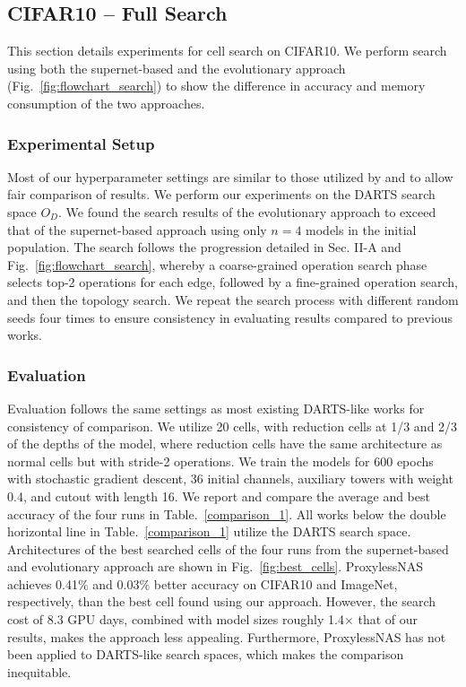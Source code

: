 \documentclass[onecolumn]{IEEEtran}
\begin{document}
\subsection{CIFAR10 – Full Search}
This section details experiments for cell search on CIFAR10. We perform search using both the supernet-based and the evolutionary approach (Fig.~\ref{fig:flowchart_search}) to show the difference in accuracy and memory consumption of the two approaches.

\subsubsection{Experimental Setup}
Most of our hyperparameter settings are similar to those utilized by \cite{Liu2018} and \cite{Wang2021} to allow fair comparison of results. We perform our experiments on the DARTS search space \( O_D \). We found the search results of the evolutionary approach to exceed that of the supernet-based approach using only \( n = 4 \) models in the initial population. The search follows the progression detailed in Sec. II-A and Fig.~\ref{fig:flowchart_search}, whereby a coarse-grained operation search phase selects top-2 operations for each edge, followed by a fine-grained operation search, and then the topology search. We repeat the search process with different random seeds four times to ensure consistency in evaluating results compared to previous works.

\subsubsection{Evaluation}
Evaluation follows the same settings as most existing DARTS-like works for consistency of comparison. We utilize 20 cells, with reduction cells at 1/3 and 2/3 of the depths of the model, where reduction cells have the same architecture as normal cells but with stride-2 operations. We train the models for 600 epochs with stochastic gradient descent, 36 initial channels, auxiliary towers with weight 0.4, and cutout with length 16. We report and compare the average and best accuracy of the four runs in Table.~\ref{comparison_1}. All works below the double horizontal line in Table.~\ref{comparison_1} utilize the DARTS search space. Architectures of the best searched cells of the four runs from the supernet-based and evolutionary approach are shown in Fig.~\ref{fig:best_cells}. ProxylessNAS \cite{Cai2018} achieves 0.41\% and 0.03\% better accuracy on CIFAR10 and ImageNet, respectively, than the best cell found using our approach. However, the search cost of 8.3 GPU days, combined with model sizes roughly 1.4× that of our results, makes the approach less appealing. Furthermore, ProxylessNAS has not been applied to DARTS-like search spaces, which makes the comparison inequitable.
\end{document}
